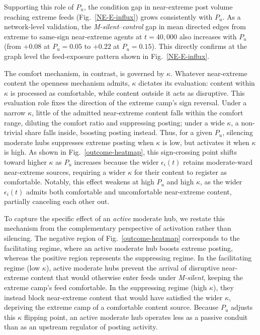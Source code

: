 \documentclass{svproc}
\def\BoundedConfidence{\epsilon} %
\def\VCR{\kappa}                 %
\begin{document}
Supporting this role of $P_u$, the condition gap in near-extreme post
volume reaching extreme feeds (Fig.~\ref{NE-E-influx}) grows
consistently with $P_u$. As a network-level validation, the
\emph{M-silent}--\emph{control} gap in mean directed edges from
extreme to same-sign near-extreme agents at $t=40{,}000$ also
increases with $P_u$ (from $+0.08$ at $P_u=0.05$ to $+0.22$ at
$P_u=0.15$). This directly confirms at the graph level the
feed-exposure pattern shown in Fig.~\ref{NE-E-influx}.
\par



The comfort mechanism, in contrast, is governed by $\VCR$. Whatever
near-extreme content the openness mechanism admits, $\VCR$ dictates
its evaluation: content within $\VCR$ is processed as comfortable,
while content outside it acts as disruptive. This evaluation role
fixes the direction of the extreme camp's sign reversal. Under a
narrow $\VCR$, little of the admitted near-extreme content falls
within the comfort range, diluting the comfort ratio and suppressing
posting; under a wide $\VCR$, a non-trivial share falls inside,
boosting posting instead. Thus, for a given $P_u$, silencing moderate
hubs suppresses extreme posting when $\VCR$ is low, but activates it
when $\VCR$ is high. As shown in Fig.~\ref{outcome-heatmap}, this
sign-crossing point shifts toward higher $\VCR$ as $P_u$ increases
because the wider $\BoundedConfidence_i(t)$ retains moderate-ward
near-extreme sources, requiring a wider $\VCR$ for their content to
register as comfortable. Notably, this effect weakens at high $P_u$
and high $\VCR$, as the wider $\BoundedConfidence_i(t)$ admits both
comfortable and uncomfortable near-extreme content, partially
canceling each other out.
\par


To capture the specific effect of an \emph{active} moderate hub, we
restate this mechanism from the complementary perspective of
activation rather than silencing. The negative region of
Fig.~\ref{outcome-heatmap} corresponds to the facilitating regime,
where an active moderate hub boosts extreme posting, whereas the
positive region represents the suppressing regime. In the facilitating
regime (low $\VCR$), active moderate hubs prevent the arrival of
disruptive near-extreme content that would otherwise enter feeds under
\emph{M-silent}, keeping the extreme camp's feed comfortable. In the
suppressing regime (high $\VCR$), they instead block near-extreme
content that would have satisfied the wider $\VCR$, depriving the
extreme camp of a comfortable content source. Because $P_u$ adjusts
this $\VCR$ flipping point, an active moderate hub operates less as a
passive conduit than as an upstream regulator of posting activity.
\end{document}
